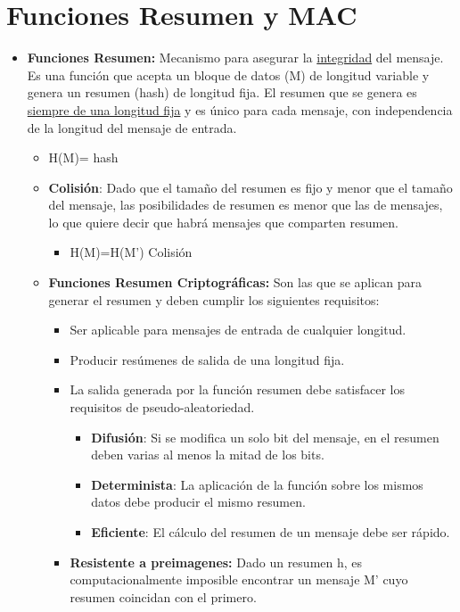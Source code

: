 \documentclass[12pt, twoside, openright]{report} %
\begin{document}
\section{Funciones Resumen y MAC}
\begin{itemize}
	\item \textbf{Funciones Resumen:} Mecanismo para asegurar la
	      \underline{integridad} del mensaje. Es una función que acepta un bloque de datos (M) de longitud variable y genera un resumen (hash) de longitud fija. El resumen que se genera es \underline{siempre de una longitud fija} y es único para cada mensaje, con independencia de la longitud del mensaje de entrada.
	      \begin{itemize}
		      \item H(M)= hash
		      \item \textbf{Colisión}: Dado que el tamaño del resumen es fijo y menor que el tamaño del mensaje, las posibilidades de resumen es menor que las de mensajes, lo que quiere decir que habrá mensajes que comparten resumen.
		            \begin{itemize}
			            \item H(M)=H(M') Colisión
		            \end{itemize}
		      \item \textbf{Funciones Resumen Criptográficas:} Son las que se aplican para generar el resumen y deben cumplir los siguientes requisitos:
		            \begin{itemize}
			            \item Ser aplicable para mensajes de entrada de cualquier longitud.
			            \item Producir resúmenes de salida de una longitud fija.
			            \item La salida generada por la función resumen debe satisfacer los requisitos de pseudo-aleatoriedad.
			                  \begin{itemize}
				                  \item \textbf{Difusión}: Si se modifica un solo bit del mensaje, en el resumen deben varias al menos la mitad de los bits.
				                  \item \textbf{Determinista}: La aplicación de la función sobre los mismos datos debe producir el mismo resumen.
				                  \item \textbf{Eficiente}: El cálculo del resumen de un mensaje debe ser rápido.
			                  \end{itemize}
			            \item \textbf{Resistente a preimagenes:} Dado un resumen h, es computacionalmente imposible encontrar un mensaje M' cuyo resumen coincidan con el primero.

\end{itemize}
\end{itemize}
\end{itemize}
\end{document}
